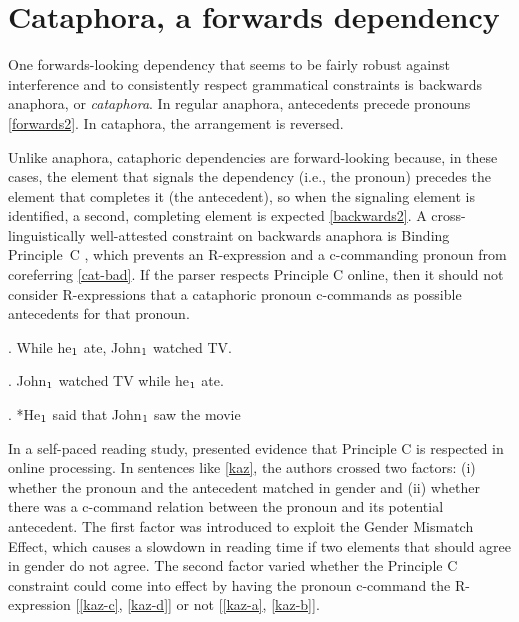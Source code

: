 \documentclass[12pt,letterpaper]{article}
\newcommand{\sub}[1]{$_{\textrm{\scriptsize{#1}}}$}
\begin{document}
\section{Cataphora, a forwards dependency} 

One forwards-looking dependency that seems to be fairly robust against interference and to consistently respect grammatical constraints is backwards anaphora, or \emph{cataphora}. In regular anaphora, antecedents precede pronouns \ref{forwards2}. In cataphora, the arrangement is reversed.

Unlike anaphora, cataphoric dependencies are forward-looking because, in these cases, the element that signals the dependency (i.e., the pronoun) precedes the element that completes it (the antecedent), so when the signaling element is identified, a second, completing element is expected \ref{backwards2}. A cross-linguistically well-attested constraint on backwards anaphora is Binding Principle~C \citep{chomsky81}, which prevents an R-expression and a c-commanding pronoun from coreferring \ref{cat-bad}. If the parser respects Principle C online, then it should not consider R-expressions that a cataphoric pronoun c-commands as possible antecedents for that pronoun. 

\ex. While he\sub{1} ate, John\sub{1} watched TV. \label{forwards2}

\ex. John\sub{1} watched TV while he\sub{1} ate. \label{backwards2}

\ex. *He\sub{1} said that John\sub{1} saw the movie \label{cat-bad}


In a self-paced reading study, \citet{kazanina07} presented evidence that Principle C is respected in online processing. In sentences like \ref{kaz}, the authors crossed two factors: (i) whether the pronoun and the antecedent matched in gender and (ii) whether there was a c-command relation between the pronoun and its potential antecedent. The first factor was introduced to exploit the Gender Mismatch Effect, which causes a slowdown in reading time if two elements that should agree in gender do not agree. The second factor varied whether the Principle C constraint could come into effect by having the pronoun c-command the R-expression [\ref{kaz-c}, \ref{kaz-d}] or not [\ref{kaz-a}, \ref{kaz-b}]. 
\end{document}
